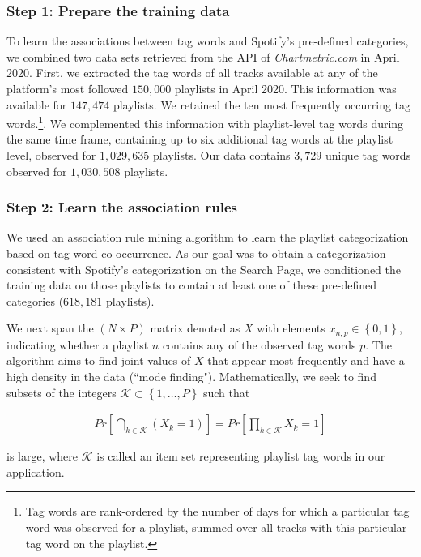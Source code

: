 \subsubsection*{Step 1: Prepare the training data}

To learn the associations between tag words and Spotify's pre-defined categories, we combined two data sets retrieved from the API of \textit{Chartmetric.com} in April 2020. First, we extracted the tag words of all tracks available at any of the platform's most followed $150,000$ playlists in April 2020. This information was available for $147,474$ playlists. We retained the ten most frequently occurring tag words.\footnote{Tag words are rank-ordered by the number of days for which a particular tag word was observed for a playlist, summed over all tracks with this particular tag word on the playlist.}. We complemented this information with playlist-level tag words during the same time frame, containing up to six additional tag words at the playlist level, observed for $1,029,635$ playlists. Our data contains $3,729$ unique tag words observed for $1,030,508$ playlists. 

\subsubsection*{Step 2: Learn the association rules}

We used an association rule mining algorithm \citep[e.g.,][]{hastie_09} to learn the playlist categorization based on tag word co-occurrence. As our goal was to obtain a categorization consistent with Spotify's categorization on the Search Page, we conditioned the training data on those playlists to contain at least one of these pre-defined categories ($618,181$ playlists).

We next span the $(N \times P)$ matrix denoted as $X$ with elements $x_{n,p} \in \left\{0,1\right\}$, indicating whether a playlist $n$ contains any of the observed tag words $p$. The algorithm aims to find joint values of $X$ that appear most frequently and have a high density in the data (``mode finding"). Mathematically, we seek to find subsets of the integers $\mathcal{K} \subset \left\{1,\dots,P\right\}$ such that 

\begin{align}
    Pr\left[\bigcap_{k \in \mathcal{K}} (X_k = 1)\right] = Pr\left[\prod_{k \in \mathcal{K}} X_k = 1\right]
\end{align}

is large, where $\mathcal{K}$ is called an item set representing playlist tag words in our application. 

